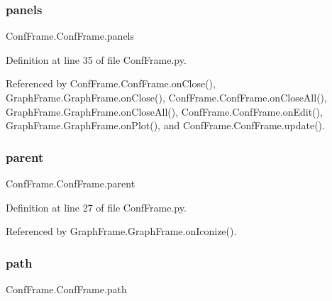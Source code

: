 \mbox{\label{classConfFrame_1_1ConfFrame_ae64b58d8e2f4dde0e65db414e4172d77}} 
\subsubsection{\texorpdfstring{panels}{panels}}
{\footnotesize\ttfamily Conf\+Frame.\+Conf\+Frame.\+panels}



Definition at line 35 of file Conf\+Frame.\+py.



Referenced by Conf\+Frame.\+Conf\+Frame.\+on\+Close(), Graph\+Frame.\+Graph\+Frame.\+on\+Close(), Conf\+Frame.\+Conf\+Frame.\+on\+Close\+All(), Graph\+Frame.\+Graph\+Frame.\+on\+Close\+All(), Conf\+Frame.\+Conf\+Frame.\+on\+Edit(), Graph\+Frame.\+Graph\+Frame.\+on\+Plot(), and Conf\+Frame.\+Conf\+Frame.\+update().

\mbox{\label{classConfFrame_1_1ConfFrame_a1943cba9d33cfcae85f83c0777150288}} 
\subsubsection{\texorpdfstring{parent}{parent}}
{\footnotesize\ttfamily Conf\+Frame.\+Conf\+Frame.\+parent}



Definition at line 27 of file Conf\+Frame.\+py.



Referenced by Graph\+Frame.\+Graph\+Frame.\+on\+Iconize().

\mbox{\label{classConfFrame_1_1ConfFrame_a1f47cd72745073b992e1ccee6d1190d7}} 
\subsubsection{\texorpdfstring{path}{path}}
{\footnotesize\ttfamily Conf\+Frame.\+Conf\+Frame.\+path}



